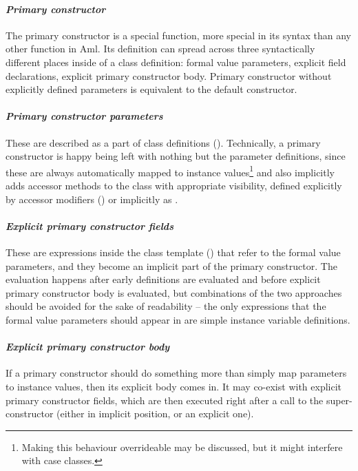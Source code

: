 \paragraph{\em Primary constructor}
The primary constructor is a special function, more special in its syntax than any other function in Aml. Its definition can spread across three syntactically different places inside of a class definition: formal value parameters, explicit field declarations, explicit primary constructor body. Primary constructor without explicitly defined parameters is equivalent to the default constructor. 

\paragraph{\em Primary constructor parameters}
These are described as a part of class definitions (). Technically, a primary constructor is happy being left with nothing but the parameter definitions, since these are always automatically mapped to instance values\footnote{Making this behaviour overrideable may be discussed, but it might interfere with case classes.} and also implicitly adds accessor methods to the class with appropriate visibility, defined explicitly by accessor modifiers () or implicitly as . 

\paragraph{\em Explicit primary constructor fields}
These are expressions inside the class template () that refer to the formal value parameters, and they become an implicit part of the primary constructor. The evaluation happens after early definitions are evaluated and before explicit primary constructor body is evaluated, but combinations of the two approaches should be avoided for the sake of readability -- the only expressions that the formal value parameters should appear in are simple instance variable definitions. 

\paragraph{\em Explicit primary constructor body}
If a primary constructor should do something more than simply map parameters to instance values, then its explicit body comes in. It may co-exist with explicit primary constructor fields, which are then executed right after a call to the super-constructor (either in implicit position, or an explicit one). 

